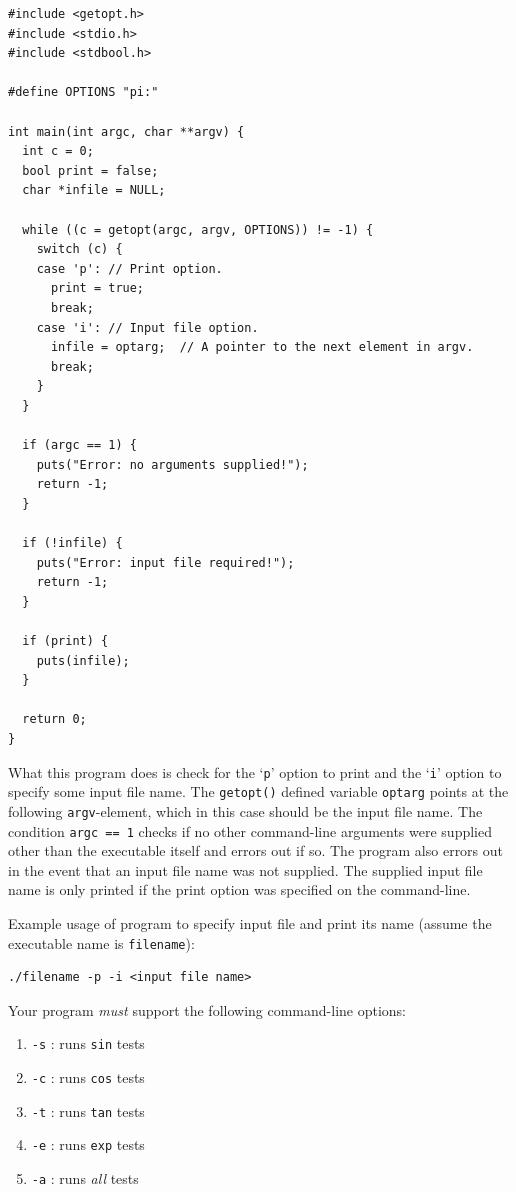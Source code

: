 \documentclass[11pt]{article}
\begin{document}
\begin{lstlisting}
#include <getopt.h>
#include <stdio.h>
#include <stdbool.h>

#define OPTIONS "pi:"

int main(int argc, char **argv) {
  int c = 0;
  bool print = false;
  char *infile = NULL;

  while ((c = getopt(argc, argv, OPTIONS)) != -1) {
    switch (c) {
    case 'p': // Print option.
      print = true;
      break;
    case 'i': // Input file option.
      infile = optarg;  // A pointer to the next element in argv.
      break;
    }
  }

  if (argc == 1) {
    puts("Error: no arguments supplied!");
    return -1;
  }

  if (!infile) {
    puts("Error: input file required!");
    return -1;
  }

  if (print) {
    puts(infile);
  }

  return 0;
}
\end{lstlisting}

What this program does is check for the `\texttt{p}' option to print and the
`\texttt{i}' option to specify some input file name.
The \texttt{getopt()} defined variable \texttt{optarg} points at the following
\texttt{argv}-element, which in this case should be the input file name. The
condition \texttt{argc == 1} checks if no other command-line arguments were
supplied other than the executable itself and errors out if so. The program also
errors out in the event that an input file name was not supplied. The supplied
input file name is only printed if the print option was specified on the
command-line.

Example usage of program to specify input file and print its name (assume the
executable name is \texttt{filename}):
\begin{lstlisting}
./filename -p -i <input file name>
\end{lstlisting}

Your program \emph{must} support the following command-line options:
\begin{enumerate}
    \item \texttt{-s} : runs \texttt{sin} tests
    \item \texttt{-c} : runs \texttt{cos} tests
    \item \texttt{-t} : runs \texttt{tan} tests
    \item \texttt{-e} : runs \texttt{exp} tests
    \item \texttt{-a} : runs \emph{all} tests
\end{enumerate}
\end{document}
